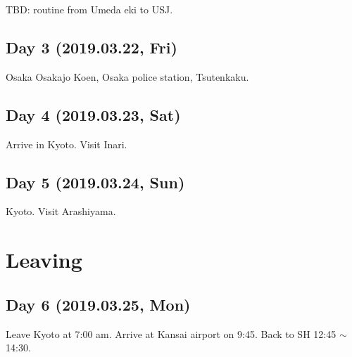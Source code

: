 \documentclass{article}
\begin{document}
TBD: routine from Umeda eki to USJ.

\subsection{Day 3 (2019.03.22, Fri)}
Osaka
Osakajo Koen, Osaka police station, Tsutenkaku.

\subsection{Day 4 (2019.03.23, Sat)}
Arrive in Kyoto.
Visit Inari.

\subsection{Day 5 (2019.03.24, Sun)}
Kyoto. Visit Arashiyama.

\section{Leaving}
\subsection{Day 6 (2019.03.25, Mon)}
Leave Kyoto at 7:00 am.
Arrive at Kansai airport on 9:45.
Back to SH 12:45 $\sim $ 14:30.
\end{document}
